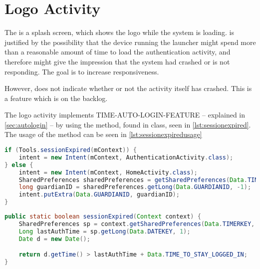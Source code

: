 \section{Logo Activity}
The  is a splash screen, which shows the \giraf[] logo while the system is loading.%
 is justified by the possibility that the device running the launcher might spend more than a reasonable amount of time to load the authentication activity, and therefore might give the impression that the system had crashed or is not responding.
The goal is to increase responsiveness.


However,  does not indicate whether or not the activity itself has crashed.
 This is a feature which is on the backlog.

The logo activity implements TIME-AUTO-LOGIN-FEATURE -- explained in \autoref{sec:autologin} -- by using the  method, found in  class, seen in \autoref{lst:sessionexpired}.
The usage of the  method can be seen in \autoref{lst:sessionexpiredusage}

\begin{lstlisting}[style=sourceCode, language=JAVA, caption=Snippet of: LogoActivity.java, label=lst:sessionexpiredusage] 
if (Tools.sessionExpired(mContext)) {
	intent = new Intent(mContext, AuthenticationActivity.class);
} else {
	intent = new Intent(mContext, HomeActivity.class);
	SharedPreferences sharedPreferences = getSharedPreferences(Data.TIMERKEY, 0);
	long guardianID = sharedPreferences.getLong(Data.GUARDIANID, -1);
	intent.putExtra(Data.GUARDIANID, guardianID);
}
\end{lstlisting}


\begin{lstlisting}[style=sourceCode, language=JAVA, caption=Snippet of: Tools.java, label=lst:sessionexpired]
public static boolean sessionExpired(Context context) {
	SharedPreferences sp = context.getSharedPreferences(Data.TIMERKEY, 0);
	Long lastAuthTime = sp.getLong(Data.DATEKEY, 1);
	Date d = new Date();

	return d.getTime() > lastAuthTime + Data.TIME_TO_STAY_LOGGED_IN;
}
	\end{lstlisting}

